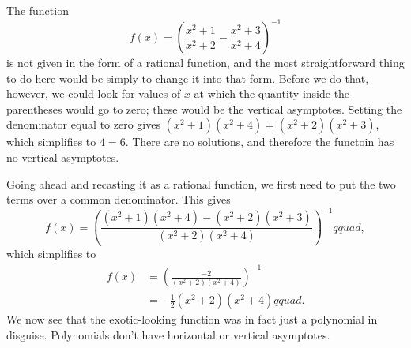 The function
\begin{equation*}
  f(x) = \left(\frac{x^2+1}{x^2+2}-\frac{x^2+3}{x^2+4}\right)^{-1} 
\end{equation*}
is not given in the form of a rational function, and the most 
straightforward thing to do here would be simply to change it into
that form. Before we do that, however, we could look for values of
$x$ at which the quantity inside the parentheses would go to zero;
these would be the vertical asymptotes. Setting the denominator
equal to zero gives $(x^2+1)(x^2+4)=(x^2+2)(x^2+3)$, which simplifies
to $4=6$. There are no solutions, and therefore the functoin has no
vertical asymptotes.

Going ahead and recasting it as a rational function, we first need to
put the two terms over a common denominator. This gives
\begin{equation*}
  f(x) = \left(\frac{(x^2+1)(x^2+4)-(x^2+2)(x^2+3)}{(x^2+2)(x^2+4)}\right)^{-1}  
qquad ,
\end{equation*}
which simplifies to
\begin{align*}
  f(x) &= \left(\frac{-2}{(x^2+2)(x^2+4)}\right)^{-1}   \\
       &= -\frac{1}{2}(x^2+2)(x^2+4) 
qquad .
\end{align*}
We now see that the exotic-looking function was in fact just a polynomial in
disguise. Polynomials don't have horizontal or vertical asymptotes.
